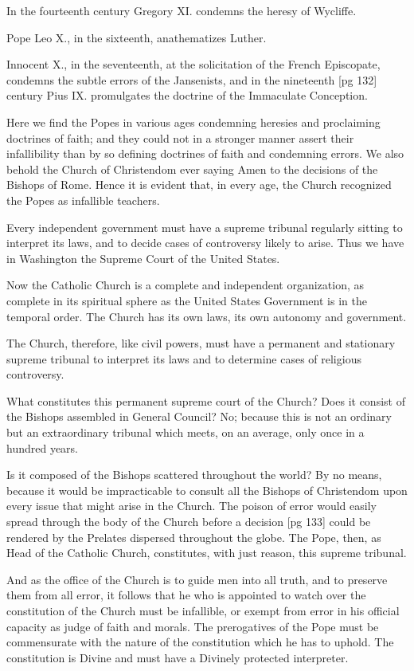 In the fourteenth century Gregory XI. condemns
the heresy of Wycliffe.

Pope Leo X., in the sixteenth, anathematizes
Luther.

Innocent X., in the seventeenth, at the solicitation
of the French Episcopate, condemns the subtle
errors of the Jansenists, and in the nineteenth
[pg 132]
century Pius IX. promulgates the doctrine of the
Immaculate Conception.

Here we find the Popes in various ages condemning
heresies and proclaiming doctrines of
faith; and they could not in a stronger manner
assert their infallibility than by so defining doctrines
of faith and condemning errors. We also
behold the Church of Christendom ever saying
Amen to the decisions of the Bishops of Rome.
Hence it is evident that, in every age, the Church
recognized the Popes as infallible teachers.

Every independent government must have a supreme
tribunal regularly sitting to interpret its
laws, and to decide cases of controversy likely to
arise. Thus we have in Washington the Supreme
Court of the United States.

Now the Catholic Church is a complete and independent
organization, as complete in its spiritual
sphere as the United States Government is in
the temporal order. The Church has its own laws,
its own autonomy and government.

The Church, therefore, like civil powers, must
have a permanent and stationary supreme tribunal
to interpret its laws and to determine cases of
religious controversy.

What constitutes this permanent supreme court
of the Church? Does it consist of the Bishops
assembled in General Council? No; because this
is not an ordinary but an extraordinary tribunal
which meets, on an average, only once in a hundred
years.

Is it composed of the Bishops scattered throughout
the world? By no means, because it would be
impracticable to consult all the Bishops of Christendom
upon every issue that might arise in the
Church. The poison of error would easily spread
through the body of the Church before a decision
[pg 133]
could be rendered by the Prelates dispersed
throughout the globe. The Pope, then, as Head
of the Catholic Church, constitutes, with just reason,
this supreme tribunal.

And as the office of the Church is to guide men
into all truth, and to preserve them from all error,
it follows that he who is appointed to watch over
the constitution of the Church must be infallible,
or exempt from error in his official capacity as
judge of faith and morals. The prerogatives of
the Pope must be commensurate with the nature
of the constitution which he has to uphold. The
constitution is Divine and must have a Divinely
protected interpreter.

